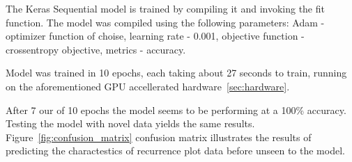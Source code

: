 \documentclass[a4paper,12pt,fleqn]{article}
\begin{document}
The Keras Sequential model is trained by compiling it and invoking the fit function.
The model was compiled using the following parameters: Adam - optimizer function of choise, learning rate - 0.001, objective function - crossentropy objective, metrics - accuracy.

Model was trained in 10 epochs, each taking about 27 seconds to train, running on the aforementioned GPU accellerated hardware~\ref{sec:hardware}.

After 7 our of 10 epochs the model seems to be performing at a 100\% accuracy.
Testing the model with novel data yields the same results.
Figure~\ref{fig:confusion_matrix} confusion matrix illustrates the results of predicting the charactestics of recurrence plot data before unseen to the model.















\end{document}
